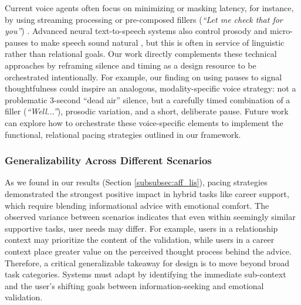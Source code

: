Current voice agents often focus on minimizing or masking latency, for instance, by using streaming processing or pre-composed fillers (\textit{``Let me check that for you''}) \cite{Yu2020FastEmit:, kum2022can}. Advanced neural text-to-speech systems also control prosody and micro-pauses to make speech sound natural \cite{Pamisetty2021ProsodyTTS, Sun2020GraphTTS:}, but this is often in service of linguistic rather than relational goals.
Our work directly complements these technical approaches by reframing silence and timing as a design resource to be orchestrated intentionally. For example, our finding on using pauses to signal thoughtfulness could inspire an analogous, modality-specific voice strategy: not a problematic 3-second ``dead air'' silence, but a carefully timed combination of a filler (\textit{``Well...''}), prosodic variation, and a short, deliberate pause. Future work can explore how to orchestrate these voice-specific elements to implement the functional, relational pacing strategies outlined in our framework.

\subsubsection{Generalizability Across Different Scenarios}
As we found in our results (Section \ref{subsubsec:aff_lis}), pacing strategies demonstrated the strongest positive impact in hybrid tasks like career support, which require blending informational advice with emotional comfort. 
The observed variance between scenarios indicates that even within seemingly similar supportive tasks, user needs may differ. For example, users in a relationship context may prioritize the content of the validation, while users in a career context place greater value on the perceived thought process behind the advice. Therefore, a critical generalizable takeaway for design is to move beyond broad task categories. Systems must adapt by identifying the immediate sub-context and the user's shifting goals between information-seeking and emotional validation.

